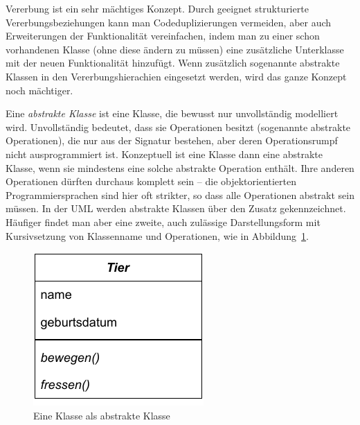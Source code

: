 Vererbung ist ein sehr mächtiges Konzept. Durch geeignet strukturierte Vererbungsbeziehungen kann man Codeduplizierungen vermeiden, aber auch Erweiterungen der Funktionalität vereinfachen, indem man zu einer schon vorhandenen Klasse (ohne diese ändern zu müssen) eine zusätzliche Unterklasse mit der neuen Funktionalität hinzufügt. Wenn zusätzlich sogenannte abstrakte Klassen in den Vererbungs\-hierachien eingesetzt werden, wird das ganze Konzept noch mächtiger.

Eine \textit{abstrakte Klasse} 
ist eine Klasse, die bewusst nur unvollständig modelliert wird. Unvollständig bedeutet, dass sie Operationen besitzt (sogenannte abstrakte Operationen), die nur aus der Signatur bestehen, aber deren Operationsrumpf nicht ausprogrammiert ist. Konzeptuell ist eine Klasse dann eine abstrakte Klasse, wenn sie mindestens eine solche abstrakte Operation enthält. Ihre anderen Operationen dürften durchaus komplett sein -- die objektorientierten Programmiersprachen sind hier oft strikter, so dass alle Operationen abstrakt sein müssen. In der UML werden abstrakte Klassen über den Zusatz  gekennzeichnet. Häufiger findet man aber eine zweite, auch zulässige Darstellungsform mit Kursivsetzung von Klassenname und Operationen, wie in Abbildung~\ref{fig:abstrakte_klasse}. 

\vspace{\baselineskip} %

\begin{figure}[h!]
	\centering
	\includegraphics[scale=1.0]{Bilder/Kapitel-8/Abstrakt2.pdf}
	\caption{Eine Klasse  als abstrakte Klasse}
	\label{fig:abstrakte_klasse}
\end{figure}

\vspace{\baselineskip} %

